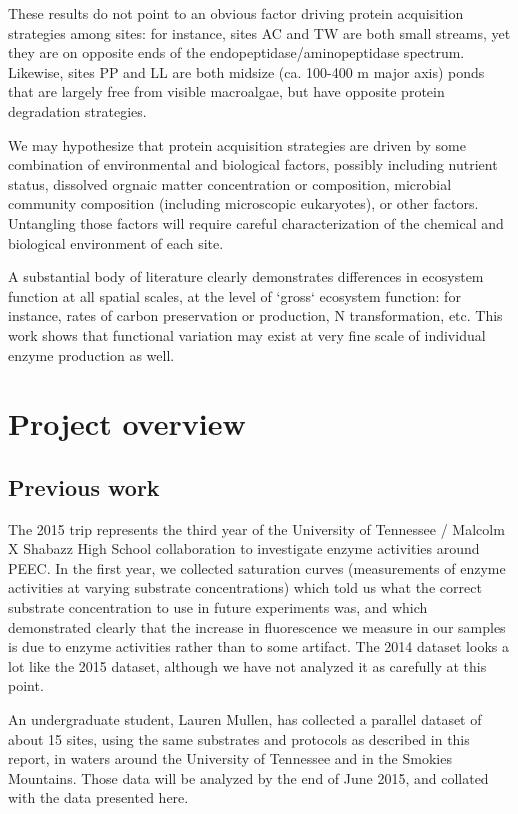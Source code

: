 \documentclass{article}
\begin{document}
    These results do not point to an obvious factor driving protein acquisition strategies among sites: for instance, sites AC and TW are both small streams, yet they are on opposite ends of the endopeptidase/aminopeptidase spectrum. Likewise, sites PP and LL are both midsize (ca. 100-400 m major axis) ponds that are largely free from visible macroalgae, but have opposite protein degradation strategies. 
    
    We may hypothesize that protein acquisition strategies are driven by some combination of environmental and biological factors, possibly including nutrient status, dissolved orgnaic matter concentration or composition, microbial community composition (including microscopic eukaryotes), or other factors. Untangling those factors will require careful characterization of the chemical and biological environment of each site.
    
    A substantial body of literature clearly demonstrates differences in ecosystem function at all spatial scales, at the level of `gross` ecosystem function: for instance, rates of carbon preservation or  production, N transformation, etc. This work shows that functional variation may exist at very fine scale of individual enzyme production as well.
    
    \section{Project overview}
    
    \subsection{Previous work}
    
    The 2015 trip represents the third year of the University of Tennessee / Malcolm X Shabazz High School collaboration to investigate enzyme activities around PEEC. In the first year, we collected saturation curves (measurements of enzyme activities at varying substrate concentrations) which told us what the correct substrate concentration to use in future experiments was, and which demonstrated clearly that the increase in fluorescence we measure in our samples is due to enzyme activities rather than to some artifact. The 2014 dataset looks a lot like the 2015 dataset, although we have not analyzed it as carefully at this point.
    
    An undergraduate student, Lauren Mullen, has collected a parallel dataset of about 15 sites, using the same substrates and protocols as described in this report, in waters around the University of Tennessee and in the Smokies Mountains. Those data will be analyzed by the end of June 2015, and collated with the data presented here.
    
\end{document}
